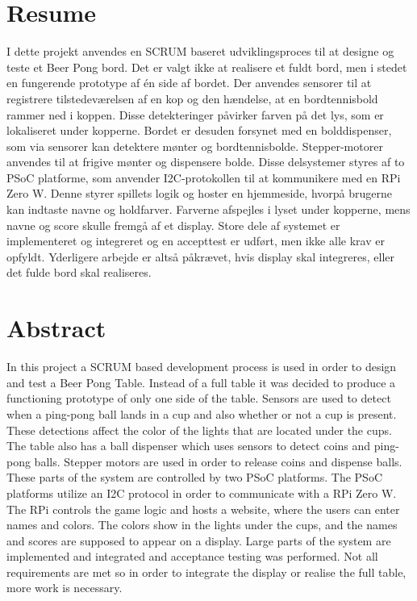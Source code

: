 \documentclass[Rapport/Rapport_main.tex]{subfiles}
\begin{document}
\section{Resume}
I dette projekt anvendes en SCRUM baseret udviklingsproces til at designe og teste et Beer Pong bord. Det er valgt ikke at realisere et fuldt bord, men i stedet en fungerende prototype af én side af bordet. Der anvendes sensorer til at registrere tilstedeværelsen af en kop og den hændelse, at en bordtennisbold rammer ned i koppen. Disse detekteringer påvirker farven på det lys, som er lokaliseret under kopperne. Bordet er desuden forsynet med en bolddispenser, som via sensorer kan detektere mønter og bordtennisbolde. Stepper-motorer anvendes til at frigive mønter og dispensere bolde. Disse delsystemer styres af to PSoC platforme, som anvender I2C-protokollen til at kommunikere med en RPi Zero W. Denne styrer spillets logik og hoster en hjemmeside, hvorpå brugerne kan indtaste navne og holdfarver. Farverne afspejles i lyset under kopperne, mens navne og score skulle fremgå af et display. Store dele af systemet er implementeret og integreret og en accepttest er udført, men ikke alle krav er opfyldt. Yderligere arbejde er altså påkrævet, hvis display skal integreres, eller det fulde bord skal realiseres.

\section{Abstract}
In this project a SCRUM based development process is used in order to design and test a Beer Pong Table. Instead of a full table it was decided to produce a functioning prototype of only one side of the table. Sensors are used to detect when a ping-pong ball lands in a cup and also whether or not a cup is present. These detections affect the color of the lights that are located under the cups. The table also has a ball dispenser which uses sensors to detect coins and ping-pong balls. Stepper motors are used in order to release coins and dispense balls. These parts of the system are controlled by two PSoC platforms. The PSoC platforms utilize an I2C protocol in order to communicate with a RPi Zero W. The RPi controls the game logic and hosts a website, where the users can enter names and colors. The colors show in the lights under the cups, and the names and scores are supposed to appear on a display. Large parts of the system are implemented and integrated and acceptance testing was performed. Not all requirements are met so in order to integrate the display or realise the full table, more work is necessary. 
\end{document}
